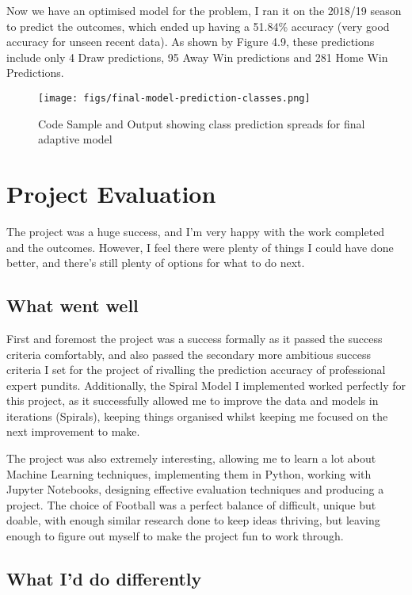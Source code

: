\documentclass[12pt,a4paper,twoside,openright]{report}
\begin{document}
Now we have an optimised model for the problem, I ran it on the 2018/19 season to predict the outcomes, which ended up having a 51.84\% accuracy (very good accuracy for unseen recent data). As shown by Figure 4.9, these predictions include only 4 Draw predictions, 95 Away Win predictions and 281 Home Win Predictions.

\begin{figure}[h]
  \centering
  \texttt{[image: figs/final-model-prediction-classes.png]}
  \caption{Code Sample and Output showing class prediction spreads for final adaptive model}
  \label{fig:final-model-prediction-classes}
\end{figure}

\section{Project Evaluation}

The project was a huge success, and I'm very happy with the work completed and the outcomes. However, I feel there were plenty of things I could have done better, and there's still plenty of options for what to do next.

\subsection{What went well}

First and foremost the project was a success formally as it passed the success criteria comfortably, and also passed the secondary more ambitious success criteria I set for the project of rivalling the prediction accuracy of professional expert pundits. Additionally, the Spiral Model I implemented worked perfectly for this project, as it successfully allowed me to improve the data and models in iterations (Spirals), keeping things organised whilst keeping me focused on the next improvement to make.

The project was also extremely interesting, allowing me to learn a lot about Machine Learning techniques, implementing them in Python, working with Jupyter Notebooks, designing effective evaluation techniques and producing a project. The choice of Football was a perfect balance of difficult, unique but doable, with enough similar research done to keep ideas thriving, but leaving enough to figure out myself to make the project fun to work through.

\subsection{What I'd do differently}
\end{document}
